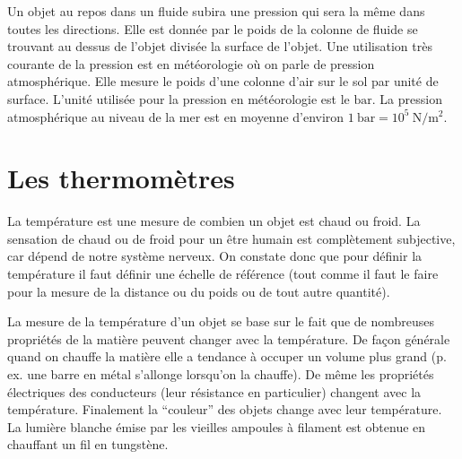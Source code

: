 \documentclass[a4paper,12pt]{book}
\newcommand{\m}{\mathrm{m}}
\newcommand{\N}{\mathrm{N}}
\renewcommand{\bar}{\mathrm{bar}}
\begin{document}
Un objet au repos dans un fluide subira une pression qui sera la même dans toutes les directions.
Elle est donnée par le poids de la colonne de fluide se trouvant au  dessus de l'objet divisée la surface de l'objet.
Une utilisation très courante de la pression est en météorologie où 
on parle de pression atmosphérique. Elle mesure le poids d'une colonne d'air 
sur le sol par unité de surface. L'unité utilisée pour la pression en météorologie est le $\bar$.
La pression atmosphérique au niveau de la mer est en moyenne d'environ $1\ \bar=10^5\ \N/\m^2$.




\section{Les thermomètres}

La température est une mesure de combien un objet est chaud ou froid. La sensation de chaud ou de froid pour un être humain
est complètement subjective, car dépend de notre système nerveux. On constate donc que pour définir la température il faut définir une 
échelle de référence (tout comme il faut le faire pour la mesure de la distance ou du poids ou de tout autre quantité).

La mesure de la température d'un objet se base sur le fait que de nombreuses propriétés
de la matière peuvent changer avec la température. De façon générale quand on chauffe la matière elle a tendance à occuper un volume plus grand (p. ex. une barre en métal s'allonge lorsqu'on la chauffe). De même les propriétés électriques des conducteurs (leur résistance en particulier) changent avec la température. Finalement la ``couleur'' des objets change avec leur température. La lumière blanche émise par les vieilles ampoules à filament
est obtenue en chauffant un fil en tungstène. 
\end{document}
